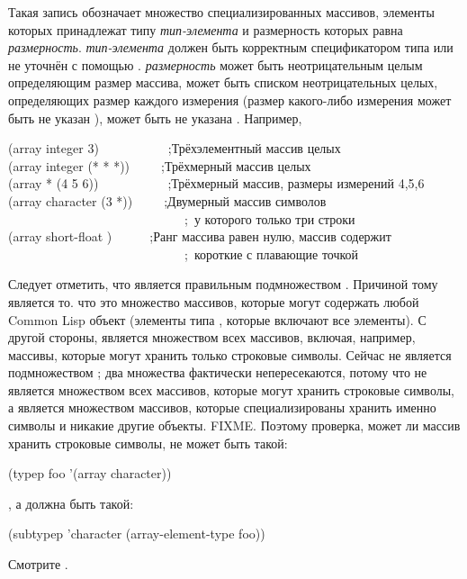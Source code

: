 \begin{flushdesc}
\item[\cd{(array \emph{тип-элемента} \emph{размерность})}]
Такая запись обозначает множество специализированных массивов, элементы которых
принадлежат типу \emph{тип-элемента} и размерность которых равна \emph{размерность}.
\emph{тип-элемента} должен быть корректным спецификатором типа или не уточнён с
помощью \cdf{*}.
\emph{размерность} может быть неотрицательным целым определяющим размер массива,
может быть списком неотрицательных целых, определяющих размер каждого измерения
(размер какого-либо измерения может быть не указан \cdf{*}), может быть не
указана \cdf{*}.
Например,
\begin{lisp}
(array integer 3)~~~~~~~~~~~;\textrm{Трёхэлементный массив целых} \\
(array integer (* * *))~~~~~;\textrm{Трёхмерный массив целых} \\
(array * (4 5 6))~~~~~~~~~~~;\textrm{Трёхмерный массив, размеры измерений
  4,5,6} \\
(array character (3 *))~~~~~;\textrm{Двумерный массив символов} \\
~~~~~~~~~~~~~~~~~~~~~~~~~~~~;~\textrm{у которого только три строки} \\
(array short-float {\emptylist})~~~~~~;\textrm{Ранг массива равен нулю, массив содержит} \\
~~~~~~~~~~~~~~~~~~~~~~~~~~~~;~\textrm{короткие с плавающие точкой}
\end{lisp}
Следует отметить, что  является правильным подмножеством
.
Причиной тому является то. что  это множество массивов, которые
могут содержать любой Common Lisp объект (элементы типа , которые включают
все элементы). С другой стороны,  является множеством всех
массивов, включая, например, массивы, которые могут хранить только строковые
символы. Сейчас  не является подмножеством ;
два множества фактически непересекаются, потому что  не
является множеством всех массивов, которые могут хранить строковые символы, а
является множеством массивов, которые специализированы хранить именно символы и
никакие другие объекты. FIXME. Поэтому проверка, может ли массив  хранить
строковые символы, не может быть такой:
\begin{lisp}
(typep foo '(array character))
\end{lisp}
, а должна быть такой:
\begin{lisp}
(subtypep 'character (array-element-type foo))
\end{lisp}
Смотрите .


\end{flushdesc}
